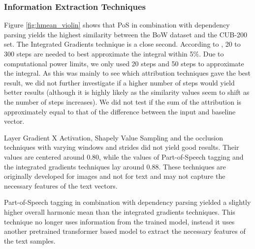 \documentclass[a4paper, 12pt, oneside]{book} %
\begin{document}
\subsubsection{Information Extraction Techniques}
Figure \ref{fig:hmean_violin} shows that PoS in combination with dependency parsing yields the highest similarity between the BoW dataset and the CUB-200 set.
The Integrated Gradients technique is a close second. 
According to \textcite{sundararajan_axiomatic_2017}, 20 to 300 steps are needed to best approximate the integral within 5\%.
Due to computational power limits, we only used 20 steps and 50 steps to approximate the integral.
As this was mainly to see which attribution techniques gave the best result, we did not further investigate if a higher number of steps would yield better results (although it is highly likely as the similarity values seem to shift as the number of steps increases).
We did not test if the sum of the attribution is approximately equal to that of the difference between the input and baseline vector.

Layer Gradient X Activation, Shapely Value Sampling and the occlusion techniques with varying windows and strides did not yield good results. 
Their values are centered around 0.80, while the values of Part-of-Speech tagging and the integrated gradients techniques lay around 0.88.
These techniques are originally developed for images and not for text and may not capture the necessary features of the text vectors.

Part-of-Speech tagging in combination with dependency parsing yielded a slightly higher overall harmonic mean than the integrated gradients techniques.
This technique no longer uses information from the trained model, instead it uses another pretrained transformer based model to extract the necessary features of the text samples.
\end{document}
